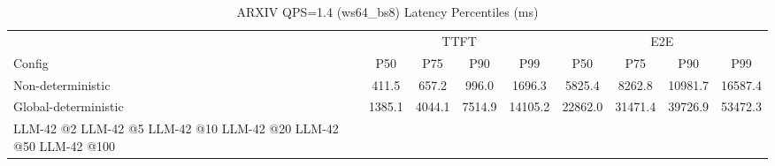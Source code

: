\begin{table}[htbp]
\centering
\caption{ARXIV QPS=1.4 (ws64_bs8) Latency Percentiles (ms)}
\label{tab:arxiv_qps1.4_ws64_bs8}
\begin{tabular}{l|cccc|cccc}
\toprule
& \multicolumn{4}{c|}{TTFT} & \multicolumn{4}{c}{E2E} \\
Config & P50 & P75 & P90 & P99 & P50 & P75 & P90 & P99 \\
\midrule
Non-deterministic & 411.5 & 657.2 & 996.0 & 1696.3 & 5825.4 & 8262.8 & 10981.7 & 16587.4 \\
Global-deterministic & 1385.1 & 4044.1 & 7514.9 & 14105.2 & 22862.0 & 31471.4 & 39726.9 & 53472.3 \\
LLM-42 @2%
LLM-42 @5%
LLM-42 @10%
LLM-42 @20%
LLM-42 @50%
LLM-42 @100%
\bottomrule
\end{tabular}
\end{table}

